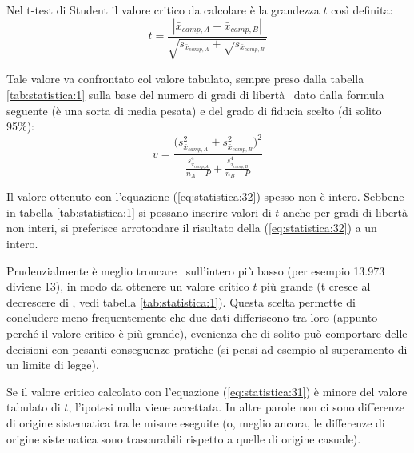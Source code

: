 Nel t-test di Student il valore critico da calcolare è la grandezza $t$ così definita:
\begin{equation} \label{eq:statistica:31}
t = \frac{|\bar{x}_{camp,A} - \bar{x}_{camp,B}|}{\sqrt{s_{\bar{x}_{camp,A}} + \sqrt{s_{\bar{x}_{camp,B}}}}}
\end{equation}

Tale valore va confrontato col valore tabulato, sempre preso dalla tabella \ref{tab:statistica:1} sulla base del numero di gradi di libertà \nu\ dato dalla formula seguente (è una sorta di media pesata) e del grado di fiducia scelto (di solito 95\%):
\begin{equation} \label{eq:statistica:32}
v = \frac{\bigl(s_{\bar{x}_{camp,A}}^2 + s_{\bar{x}_{camp,B}}^2\bigr)^2}{\frac{s_{\bar{x}_{camp,A}}^4}{n_A - P} + \frac{s_{\bar{x}_{camp,B}}^4}{n_B - P}}
\end{equation}

Il valore ottenuto con l'equazione (\ref{eq:statistica:32}) spesso non è intero. Sebbene in tabella \ref{tab:statistica:1} si possano inserire valori di $t$ anche per gradi di libertà non interi, si preferisce arrotondare il risultato della (\ref{eq:statistica:32}) a un intero.

 Prudenzialmente è meglio troncare \nu\ sull'intero più basso (per esempio 13.973 diviene 13), in modo da ottenere un valore critico $t$ più grande (t cresce al decrescere di \nu, vedi tabella \ref{tab:statistica:1}). Questa scelta permette di concludere meno frequentemente che due dati differiscono tra loro (appunto perché il valore critico è più grande), evenienza che di solito può comportare delle decisioni con pesanti conseguenze pratiche (si pensi ad esempio al superamento di un limite di legge).

Se il valore critico calcolato con l'equazione (\ref{eq:statistica:31}) è minore del valore tabulato di $t$, l'ipotesi nulla viene accettata. In altre parole non ci sono differenze di origine sistematica tra le misure eseguite (o, meglio ancora, le differenze di origine sistematica sono trascurabili rispetto a quelle di origine casuale).

